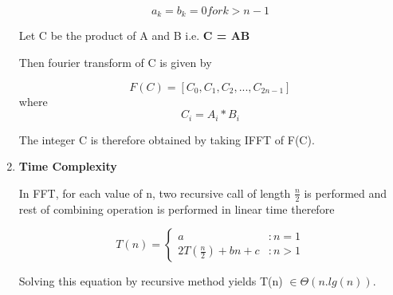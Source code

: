 \documentclass[a4paper,11pt]{article}
\begin{document}
\begin{enumerate}
\begin{equation}
a_{k} = b_{k} = 0 for k > n-1 \end{equation}

Let C be the product of A and B i.e. \textbf{C = AB}

Then fourier transform of C is given by

\begin{equation}
F(C) = [C_{0}, C_{1}, C_{2}, ..., C_{2n-1}] \end{equation} where \begin{equation}
C_i = A_i * B_i\end{equation}

The integer C is therefore obtained by taking IFFT of F(C).

\item \textbf{Time Complexity}

In FFT, for each value of n, two recursive call of length $\frac{n}{2}$ is performed and rest of combining operation is performed in linear time therefore

 \begin{displaymath}   T(n) = \left\{
     \begin{array}{lr}
       a & : n = 1\\
       2T(\frac{n}{2}) + bn +c & : n > 1
     \end{array}
   \right.
\end{displaymath}

Solving this equation by recursive method yields T(n) $\in \Theta (n.lg(n))$.
 
\end{enumerate}
\end{document}
